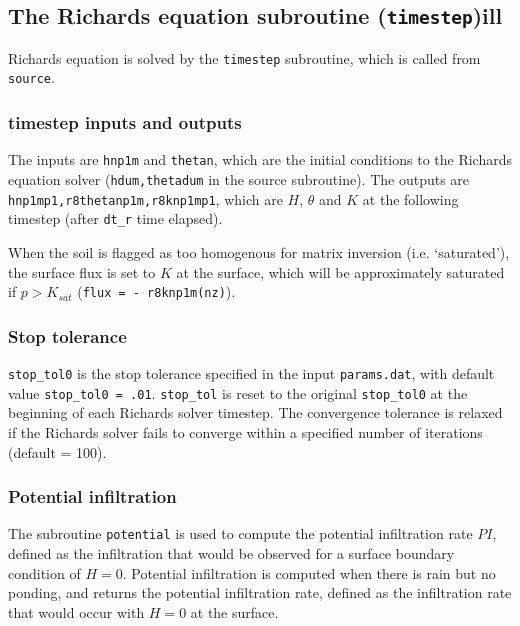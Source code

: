 \documentclass{article}
\newcommand{\code}[1]{\texttt{#1}}
\begin{document}
	
 

\subsection{The Richards equation subroutine (\code{timestep})ill }

Richards equation is solved by the \code{timestep} subroutine, which is called from \code{source}.
	
\subsubsection*{timestep inputs and outputs }
The inputs are \code{hnp1m} and \code{thetan}, which are the initial conditions to the Richards equation solver (\code{hdum,thetadum} in the source subroutine).  
The outputs are  \code{hnp1mp1,r8thetanp1m,r8knp1mp1}, which are  $H$, $\theta$ and $K$ at the following timestep (after \code{dt\_r}  time elapsed).



When the soil is flagged as too homogenous for matrix inversion (i.e. `saturated'),  the surface flux is set to $K$ at the surface, which will be approximately saturated if $p > K_{sat}$ (\code{flux  = - r8knp1m(nz)}).  

\subsubsection*{Stop tolerance }
\code{stop\_tol0} is the stop tolerance specified in the input \code{params.dat}, with default value \code{stop\_tol0 = .01}.  
\code{stop\_tol} is reset to the original \code{stop\_tol0}  at the beginning of each Richards solver timestep.  The convergence tolerance  is relaxed if the Richards solver fails to converge within a specified number of iterations (default = 100).



\subsubsection*{Potential infiltration}

The subroutine \code{potential} is used to compute the potential infiltration rate $PI$, defined as the infiltration that would be observed for a surface boundary condition of $H=0$. 
Potential infiltration is computed when there is rain but no ponding, and returns the potential infiltration rate, defined as the infiltration rate that would occur with $H=0$ at the surface.  
\end{document}
